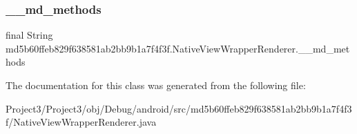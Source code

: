 \subsubsection{\texorpdfstring{\+\_\+\+\_\+md\+\_\+methods}{\_\_md\_methods}}
{\footnotesize\ttfamily final String md5b60ffeb829f638581ab2bb9b1a7f4f3f.\+Native\+View\+Wrapper\+Renderer.\+\_\+\+\_\+md\+\_\+methods\hspace{0.3cm}{\ttfamily [static]}}



The documentation for this class was generated from the following file\+:\begin{DoxyCompactItemize}
\item 
Project3/\+Project3/obj/\+Debug/android/src/md5b60ffeb829f638581ab2bb9b1a7f4f3f/Native\+View\+Wrapper\+Renderer.\+java\end{DoxyCompactItemize}
